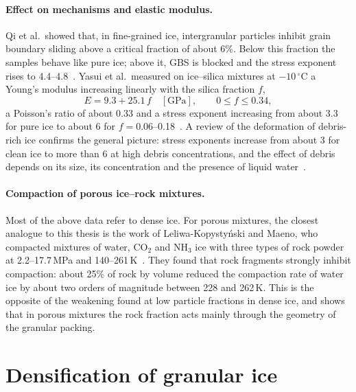 \paragraph{Effect on mechanisms and elastic modulus.} Qi et al.\ showed that, in fine-grained ice, intergranular particles inhibit grain boundary sliding above a critical fraction of about 6\%. Below this fraction the samples behave like pure ice; above it, GBS is blocked and the stress exponent rises to 4.4--4.8~\cite{qi2018}. Yasui et al.\ measured on ice--silica mixtures at $-10\,^\circ$C a Young's modulus increasing linearly with the silica fraction $f$,
\begin{equation}
    E = 9.3 + 25.1\,f \quad [\mathrm{GPa}], \qquad 0\le f\le0.34,
    \label{eq:yasui}
\end{equation}
a Poisson's ratio of about 0.33 and a stress exponent increasing from about 3.3 for pure ice to about 6 for $f = 0.06$--0.18~\cite{yasui2017}. A review of the deformation of debris-rich ice confirms the general picture: stress exponents increase from about 3 for clean ice to more than 6 at high debris concentrations, and the effect of debris depends on its size, its concentration and the presence of liquid water~\cite{moore2014}.

\paragraph{Compaction of porous ice--rock mixtures.} Most of the above data refer to dense ice. For porous mixtures, the closest analogue to this thesis is the work of Leliwa-Kopysty\'nski and Maeno, who compacted mixtures of water, CO$_2$ and NH$_3$ ice with three types of rock powder at 2.2--17.7\,MPa and 140--261\,K~\cite{leliwa1993}. They found that rock fragments strongly inhibit compaction: about 25\% of rock by volume reduced the compaction rate of water ice by about two orders of magnitude between 228 and 262\,K. This is the opposite of the weakening found at low particle fractions in dense ice, and shows that in porous mixtures the rock fraction acts mainly through the geometry of the granular packing.

\section{Densification of granular ice}
\label{sec:firn}

